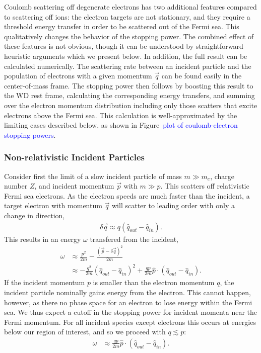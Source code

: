 \documentclass[twocolumn,preprintnumbers,amsmath,amssymb,prd, superscriptaddress]{revtex4} %
\begin{document}
\begin{appendices}
Coulomb scattering off degenerate electrons has two additional features compared to scattering off ions: the electron targets are not stationary, and they require a threshold energy transfer in order to be scattered out of the Fermi sea.
This qualitatively changes the behavior of the stopping power.
The combined effect of these features is not obvious, though it can be understood by straightforward heuristic arguments which we present below.
In addition, the full result can be calculated numerically.
The scattering rate between an incident particle and the population of electrons with a given momentum $\vec{q}$ can be found easily in the center-of-mass frame.
The stopping power then follows by boosting this result to the WD rest frame, calculating the corresponding energy transfers, and summing over the electron momentum distribution including only those scatters that excite electrons above the Fermi sea.
This calculation is well-approximated by the limiting cases described below, as shown in Figure~\textcolor{blue}{plot of coulomb-electron stopping powers}.

\subsubsection{Non-relativistic Incident Particles}
Consider first the limit of a slow incident particle of mass $m \gg m_e$, charge number $Z$, and incident momentum $\vec{p}$ with $m \gg p$.
This scatters off relativistic Fermi sea electrons.
As the electron speeds are much faster than the incident, a target electron with momentum $\vec{q}$ will scatter to leading order with only a change in direction,
\begin{align}
  \delta \vec{q} \approx q \left(\hat{q}_{out} - \hat{q}_{in}\right).
\end{align}
This results in an energy $\omega$ transfered from the incident,
\begin{align}
  \omega &\approx \frac{p^2}{2 m} -
    \frac{\left(\vec{p} - \delta \vec{q}\right)^2}{2 m} \\
    &\approx -\frac{q^2}{2m}  \left(\hat{q}_{out} - \hat{q}_{in}\right)^2
  + \frac{q p}{2m} \hat{p} \cdot \left(\hat{q}_{out} - \hat{q}_{in}\right).
\end{align}
If the incident momentum $p$ is smaller than the electron momentum $q$, the incident particle nominally gains energy from the electron.
This cannot happen, however, as there no phase space for an electron to lose energy within the Fermi sea.
We thus expect a cutoff in the stopping power for incident momenta near the Fermi momentum.
For all incident species except electrons this occurs at energies below our region of interest, and so we proceed with $q \lesssim p$:
\begin{align}
  \omega &\approx \frac{q p}{2m}
  \hat{p} \cdot \left(\hat{q}_{out} - \hat{q}_{in}\right).
\end{align}


\end{appendices}
\end{document}
